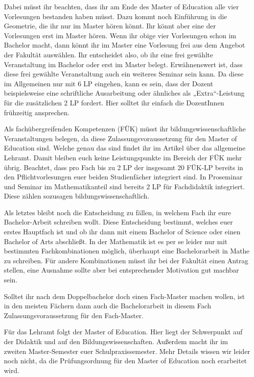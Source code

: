 Dabei müsst ihr beachten, dass ihr am Ende des Master of Education alle vier
Vorlesungen bestanden haben müsst. Dazu kommt noch Einführung in die Geometrie,
die ihr nur im Master hören könnt. Ihr könnt aber eine der Vorlesungen erst im
Master hören. Wenn ihr obige vier Vorlesungen schon im Bachelor macht, dann
könnt ihr im Master eine Vorlesung frei aus dem Angebot der Fakultät auswählen.
Ihr entscheidet also, ob ihr eine frei gewählte Veranstaltung im Bachelor oder
erst im Master belegt.  Erwähnenswert ist, dass diese frei gewählte
Veranstaltung auch ein weiteres Seminar sein kann. Da diese im Allgemeinen nur
mit 6 \gls{LP} eingehen, kann es sein, dass der Dozent beispielsweise eine
schriftliche Ausarbeitung oder ähnliches als „Extra“-Leistung für die
zusätzlichen 2 \gls{LP} fordert. Hier solltet ihr einfach die DozentInnen
frühzeitig ansprechen.

Als fachübergreifenden Kompetenzen (FÜK) müsst ihr bildungswissenschaftliche
Veranstaltungen belegen, da diese Zulassungsvoraussetzung für den Master of
Education sind. Welche genau das sind findet ihr im Artikel über das allgemeine
Lehramt. Damit bleiben euch keine Leistungspunkte im Bereich der FÜK mehr übrig.
Beachtet, dass pro Fach bis zu 2 \gls{LP} der insgesamt 20 FÜK-\gls{LP} bereits
in den Pflichtvorlesungen euer beiden Studienfächer integriert sind. In
Proseminar und Seminar im Mathematikanteil sind bereits 2 \gls{LP} für
Fachdidaktik integriert.  Diese zählen sozusagen bildungswissenschaftlich.

Als letztes bleibt noch die Entscheidung zu fällen, in welchem Fach ihr eure
Bachelor-Arbeit schreiben wollt. Diese Entscheidung bestimmt, welches euer
erstes Hauptfach ist und ob ihr dann mit einem Bachelor of Science oder einen
Bachelor of Arts abschließt.
In der Mathematik ist es per se leider nur mit bestimmten Fachkombinationen
möglich, überhaupt eine Bachelorarbeit in Mathe zu schreiben.  Für andere
Kombinationen müsst ihr bei der Fakultät einen Antrag stellen, eine Ausnahme
sollte aber bei entsprechender Motivation gut machbar sein.

Solltet ihr nach dem Doppelbachelor doch einen Fach-Master machen wollen, ist in
den meisten Fächern dann auch die Bachelorarbeit in diesem Fach
Zulassungsvoraussetzung für den Fach-Master.

Für das Lehramt folgt der Master of Education. Hier liegt der Schwerpunkt auf
der Didaktik und auf den Bildungswissenschaften. Außerdem macht ihr im zweiten
Master-Semester euer Schulpraxissemester. Mehr Details wissen wir leider noch
nicht, da die Prüfungsordnung für den Master of Education noch erarbeitet wird.
